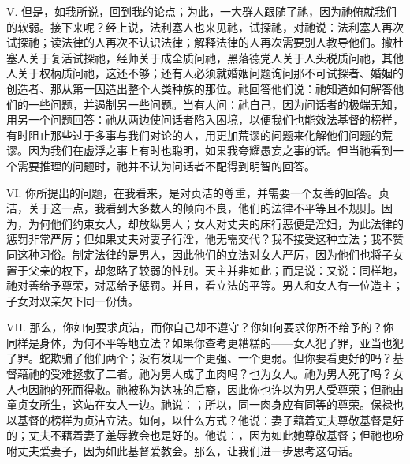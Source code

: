 V. 但是，如我所说，回到我的论点；为此，一大群人跟随了祂，因为祂俯就我们的软弱。接下来呢？经上说，法利塞人也来见祂，试探祂，对祂说：法利塞人再次试探祂；读法律的人再次不认识法律；解释法律的人再次需要别人教导他们。撒杜塞人关于复活试探祂，经师关于成全质问祂，黑落德党人关于人头税质问祂，其他人关于权柄质问祂，这还不够；还有人必须就婚姻问题询问那不可试探者、婚姻的创造者、那从第一因造出整个人类种族的那位。祂回答他们说：祂知道如何解答他们的一些问题，并遏制另一些问题。当有人问：祂自己，因为问话者的极端无知，用另一个问题回答：祂从两边使问话者陷入困境，以便我们也能效法基督的榜样，有时阻止那些过于多事与我们对论的人，用更加荒谬的问题来化解他们问题的荒谬。因为我们在虚浮之事上有时也聪明，如果我夸耀愚妄之事的话。但当祂看到一个需要推理的问题时，祂并不认为问话者不配得到明智的回答。\par

VI. 你所提出的问题，在我看来，是对贞洁的尊重，并需要一个友善的回答。贞洁，关于这一点，我看到大多数人的倾向不良，他们的法律不平等且不规则。因为，为何他们约束女人，却放纵男人；女人对丈夫的床行恶便是淫妇，为此法律的惩罚非常严厉；但如果丈夫对妻子行淫，他无需交代？我不接受这种立法；我不赞同这种习俗。制定法律的是男人，因此他们的立法对女人严厉，因为他们也将子女置于父亲的权下，却忽略了较弱的性别。天主并非如此；而是说：又说：同样地，祂对善给予尊荣，对恶给予惩罚。并且，看立法的平等。男人和女人有一位造主；子女对双亲欠下同一份债。\par

VII. 那么，你如何要求贞洁，而你自己却不遵守？你如何要求你所不给予的？你同样是身体，为何不平等地立法？如果你查考更糟糕的——女人犯了罪，亚当也犯了罪。蛇欺骗了他们两个；没有发现一个更强、一个更弱。但你要看更好的吗？基督藉祂的受难拯救了二者。祂为男人成了血肉吗？也为女人。祂为男人死了吗？女人也因祂的死而得救。祂被称为达味的后裔，因此你也许以为男人受尊荣；但祂由童贞女所生，这站在女人一边。祂说：；所以，同一肉身应有同等的尊荣。保禄也以基督的榜样为贞洁立法。如何，以什么方式？他说：妻子藉着丈夫尊敬基督是好的；丈夫不藉着妻子羞辱教会也是好的。他说：，因为如此她尊敬基督；但祂也吩咐丈夫爱妻子，因为如此基督爱教会。那么，让我们进一步思考这句话。\par

